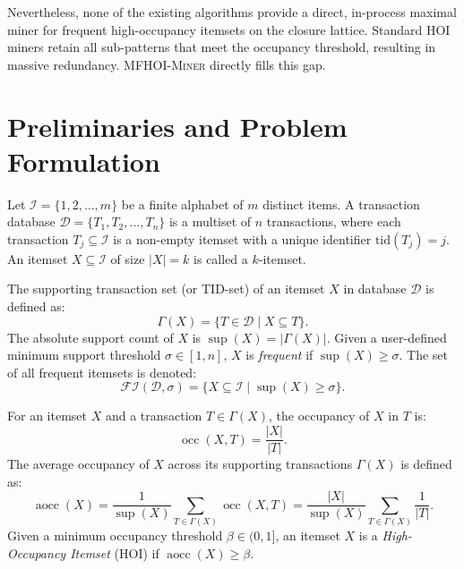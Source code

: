 \documentclass[runningheads,orivec]{llncs}
\newcommand{\supp}{\operatorname{sup}}
\newcommand{\aocc}{\operatorname{aocc}}
\newcommand{\occ}{\operatorname{occ}}
\newcommand{\FI}{\ensuremath{\mathcal{FI}}}
\newcommand{\MFHOIMiner}{\textsc{MFHOI-Miner}}
\begin{document}
Nevertheless, none of the existing algorithms provide a direct, in-process maximal miner for frequent high-occupancy itemsets on the closure lattice. Standard HOI miners retain all sub-patterns that meet the occupancy threshold, resulting in massive redundancy. \MFHOIMiner{} directly fills this gap.

\section{Preliminaries and Problem Formulation}
\label{sec:prelim}

Let $\mathcal{I} = \{1, 2, \dots, m\}$ be a finite alphabet of $m$ distinct items. A transaction database $\mathcal{D} = \{T_1, T_2, \dots, T_n\}$ is a multiset of $n$ transactions, where each transaction $T_j \subseteq \mathcal{I}$ is a non-empty itemset with a unique identifier $\text{tid}(T_j) = j$. An itemset $X \subseteq \mathcal{I}$ of size $|X| = k$ is called a $k$-itemset.

\begin{definition}
The supporting transaction set (or TID-set) of an itemset $X$ in database $\mathcal{D}$ is defined as:
\begin{equation}
\Gamma(X) = \{T \in \mathcal{D} \mid X \subseteq T\}.
\end{equation}
The absolute support count of $X$ is $\supp(X) = |\Gamma(X)|$. Given a user-defined minimum support threshold $\sigma \in [1, n]$, $X$ is \emph{frequent} if $\supp(X) \ge \sigma$. The set of all frequent itemsets is denoted:
\begin{equation}
\FI(\mathcal{D}, \sigma) = \{X \subseteq \mathcal{I} \mid \supp(X) \ge \sigma\}.
\end{equation}
\end{definition}

\begin{definition}
For an itemset $X$ and a transaction $T \in \Gamma(X)$, the occupancy of $X$ in $T$ is:
\begin{equation}
\occ(X, T) = \frac{|X|}{|T|}.
\end{equation}
The average occupancy of $X$ across its supporting transactions $\Gamma(X)$ is defined as:
\begin{equation}
\label{eq:aocc}
\aocc(X) = \frac{1}{\supp(X)} \sum_{T \in \Gamma(X)} \occ(X, T) = \frac{|X|}{\supp(X)} \sum_{T \in \Gamma(X)} \frac{1}{|T|}.
\end{equation}
Given a minimum occupancy threshold $\beta \in (0, 1]$, an itemset $X$ is a \emph{High-Occupancy Itemset} (HOI) if $\aocc(X) \ge \beta$.
\end{definition}
\end{document}
